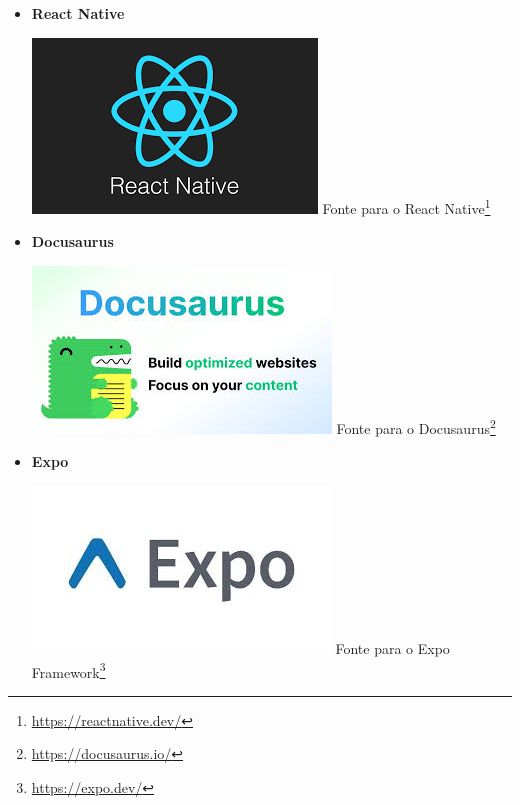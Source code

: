\documentclass[12pt, openany, oneside, a4paper, english, brazil]{abntex2}   %
\begin{document}
\begin{itemize}

    \item \textbf{React Native} 
    \begin{center}
    \includegraphics[width=0.5\linewidth]{figuras/Tecnologies/React Native.png}
    \label{fig:React Native}
    Fonte para o React Native\footnote{\url{https://reactnative.dev/}}
    \end{center}



    \item \textbf{Docusaurus} 
    \begin{center}
    \includegraphics[width=0.5\linewidth]{figuras/Tecnologies/Docusaurus.jpg}
    \label{fig:Docusaurus}
    Fonte para o Docusaurus\footnote{\url{https://docusaurus.io/}}
\end{center}



    
    \item \textbf{Expo}
    \begin{center}
    \includegraphics[width=0.5\linewidth]{figuras/Tecnologies/Expo Framework.jpeg}
    \label{fig:Expo}
    Fonte para o Expo Framework\footnote{\url{https://expo.dev/}}
\end{center}



\end{itemize}
\end{document}
